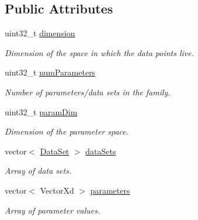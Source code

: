 \subsection*{Public Attributes}
\begin{DoxyCompactItemize}
\item 
\hypertarget{struct_d_r_d_s_p_1_1_data_system_ab6aefaa08cd0a5b6a9e83105ecd56289}{uint32\-\_\-t \hyperlink{struct_d_r_d_s_p_1_1_data_system_ab6aefaa08cd0a5b6a9e83105ecd56289}{dimension}}\label{struct_d_r_d_s_p_1_1_data_system_ab6aefaa08cd0a5b6a9e83105ecd56289}

\begin{DoxyCompactList}\small\item\em Dimension of the space in which the data points live. \end{DoxyCompactList}\item 
\hypertarget{struct_d_r_d_s_p_1_1_data_system_a621ef4f4452821030bb57e93dadf334e}{uint32\-\_\-t \hyperlink{struct_d_r_d_s_p_1_1_data_system_a621ef4f4452821030bb57e93dadf334e}{num\-Parameters}}\label{struct_d_r_d_s_p_1_1_data_system_a621ef4f4452821030bb57e93dadf334e}

\begin{DoxyCompactList}\small\item\em Number of parameters/data sets in the family. \end{DoxyCompactList}\item 
\hypertarget{struct_d_r_d_s_p_1_1_data_system_a11e4d274af9cfc398b7f1b6b49427f9b}{uint32\-\_\-t \hyperlink{struct_d_r_d_s_p_1_1_data_system_a11e4d274af9cfc398b7f1b6b49427f9b}{param\-Dim}}\label{struct_d_r_d_s_p_1_1_data_system_a11e4d274af9cfc398b7f1b6b49427f9b}

\begin{DoxyCompactList}\small\item\em Dimension of the parameter space. \end{DoxyCompactList}\item 
\hypertarget{struct_d_r_d_s_p_1_1_data_system_a5fe0b41909f9056f986b4284e0fcb614}{vector$<$ \hyperlink{struct_d_r_d_s_p_1_1_data_set}{Data\-Set} $>$ \hyperlink{struct_d_r_d_s_p_1_1_data_system_a5fe0b41909f9056f986b4284e0fcb614}{data\-Sets}}\label{struct_d_r_d_s_p_1_1_data_system_a5fe0b41909f9056f986b4284e0fcb614}

\begin{DoxyCompactList}\small\item\em Array of data sets. \end{DoxyCompactList}\item 
\hypertarget{struct_d_r_d_s_p_1_1_data_system_aae14ac3e8c2e1a397759cd3a4d8a102f}{vector$<$ Vector\-Xd $>$ \hyperlink{struct_d_r_d_s_p_1_1_data_system_aae14ac3e8c2e1a397759cd3a4d8a102f}{parameters}}\label{struct_d_r_d_s_p_1_1_data_system_aae14ac3e8c2e1a397759cd3a4d8a102f}

\begin{DoxyCompactList}\small\item\em Array of parameter values. \end{DoxyCompactList}\end{DoxyCompactItemize}



